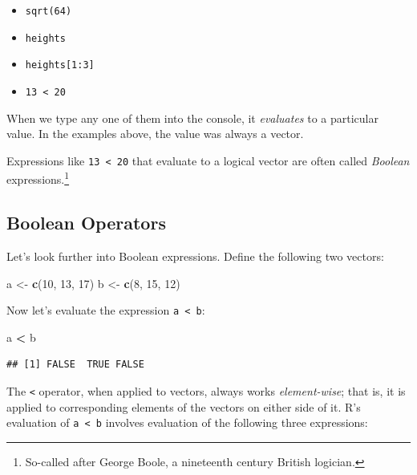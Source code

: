 \documentclass[]{book}
\makeatletter
\newenvironment{Shaded}{\begin{snugshade}}{\end{snugshade}}
\newcommand{\KeywordTok}[1]{\textcolor[rgb]{0.13,0.29,0.53}{\textbf{#1}}}
\newcommand{\DecValTok}[1]{\textcolor[rgb]{0.00,0.00,0.81}{#1}}
\newcommand{\StringTok}[1]{\textcolor[rgb]{0.31,0.60,0.02}{#1}}
\newcommand{\OperatorTok}[1]{\textcolor[rgb]{0.81,0.36,0.00}{\textbf{#1}}}
\newcommand{\NormalTok}[1]{#1}
\providecommand{\tightlist}{%
  \setlength{\itemsep}{0pt}\setlength{\parskip}{0pt}}
\let\rmarkdownfootnote\footnote%
\def\footnote{\protect\rmarkdownfootnote}
\newenvironment{kframe}{%
\medskip{}
\setlength{\fboxsep}{.8em}
 \def\at@end@of@kframe{}%
 \ifinner\ifhmode%
  \def\at@end@of@kframe{\end{minipage}}%
  \begin{minipage}{\columnwidth}%
 \fi\fi%
 \def\FrameCommand##1{\hskip\@totalleftmargin \hskip-\fboxsep
 \colorbox{shadecolor}{##1}\hskip-\fboxsep
     \hskip-\linewidth \hskip-\@totalleftmargin \hskip\columnwidth}%
 \MakeFramed {\advance\hsize-\width
   \@totalleftmargin\z@ \linewidth\hsize
   \@setminipage}}%
 {\par\unskip\endMakeFramed%
 \at@end@of@kframe}
\renewenvironment{Shaded}{\begin{kframe}}{\end{kframe}}
\theoremstyle{definition}
\theoremstyle{definition}
\theoremstyle{definition}
\theoremstyle{remark}
\makeatother
\begin{document}
\begin{itemize}
\tightlist
\item
  \texttt{sqrt(64)}
\item
  \texttt{heights}
\item
  \texttt{heights{[}1:3{]}}
\item
  \texttt{13\ \textless{}\ 20}
\end{itemize}

When we type any one of them into the console, it \emph{evaluates} to a
particular value. In the examples above, the value was always a vector.

Expressions like \texttt{13\ \textless{}\ 20} that evaluate to a logical
vector are often called \emph{Boolean} expressions.\footnote{So-called
  after George Boole, a nineteenth century British logician.}

\subsection{Boolean Operators}\label{boolean-operators}

Let's look further into Boolean expressions. Define the following two
vectors:

\begin{Shaded}
\begin{Highlighting}[]
\NormalTok{a <-}\StringTok{ }\KeywordTok{c}\NormalTok{(}\DecValTok{10}\NormalTok{, }\DecValTok{13}\NormalTok{, }\DecValTok{17}\NormalTok{)}
\NormalTok{b <-}\StringTok{ }\KeywordTok{c}\NormalTok{(}\DecValTok{8}\NormalTok{, }\DecValTok{15}\NormalTok{, }\DecValTok{12}\NormalTok{)}
\end{Highlighting}
\end{Shaded}

Now let's evaluate the expression \texttt{a\ \textless{}\ b}:

\begin{Shaded}
\begin{Highlighting}[]
\NormalTok{a }\OperatorTok{<}\StringTok{ }\NormalTok{b}
\end{Highlighting}
\end{Shaded}

\begin{verbatim}
## [1] FALSE  TRUE FALSE
\end{verbatim}

The \texttt{\textless{}} operator, when applied to vectors, always works
\emph{element-wise}; that is, it is applied to corresponding elements of
the vectors on either side of it. R's evaluation of
\texttt{a\ \textless{}\ b} involves evaluation of the following three
expressions:
\end{document}

